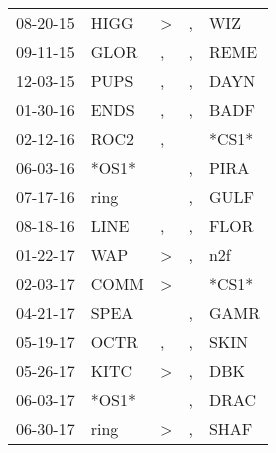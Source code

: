 \begin{supertabular}{p{0.07\textwidth}p{0.06\textwidth}p{0.02\textwidth}p{0.02\textwidth}p{0.06\textwidth}}
          08-20-15\textsuperscript{} &           HIGG\textsuperscript{} &     \textgreater &             , &            WIZ\textsuperscript{} \\
          09-11-15\textsuperscript{} &           GLOR\textsuperscript{} &                , &             , &           REME\textsuperscript{} \\
          12-03-15\textsuperscript{} &           PUPS\textsuperscript{} &                , &             , &           DAYN\textsuperscript{} \\
          01-30-16\textsuperscript{} &           ENDS\textsuperscript{} &                , &             , &           BADF\textsuperscript{} \\
          02-12-16\textsuperscript{} &           ROC2\textsuperscript{} &                , &               &                            *CS1* \\
          06-03-16\textsuperscript{} &                            *OS1* &                  &             , &           PIRA\textsuperscript{} \\
          07-17-16\textsuperscript{} &           ring\textsuperscript{} &                  &             , &           GULF\textsuperscript{} \\
          08-18-16\textsuperscript{} &           LINE\textsuperscript{} &                , &             , &           FLOR\textsuperscript{} \\
          01-22-17\textsuperscript{} &            WAP\textsuperscript{} &     \textgreater &             , &            n2f\textsuperscript{} \\
          02-03-17\textsuperscript{} &           COMM\textsuperscript{} &     \textgreater &               &                            *CS1* \\
          04-21-17\textsuperscript{} &           SPEA\textsuperscript{} &                  &             , &           GAMR\textsuperscript{} \\
          05-19-17\textsuperscript{} &           OCTR\textsuperscript{} &                , &             , &           SKIN\textsuperscript{} \\
          05-26-17\textsuperscript{} &           KITC\textsuperscript{} &     \textgreater &             , &            DBK\textsuperscript{} \\
          06-03-17\textsuperscript{} &                            *OS1* &                  &             , &           DRAC\textsuperscript{} \\
          06-30-17\textsuperscript{} &           ring\textsuperscript{} &     \textgreater &             , &           SHAF\textsuperscript{} \\

\end{supertabular}

